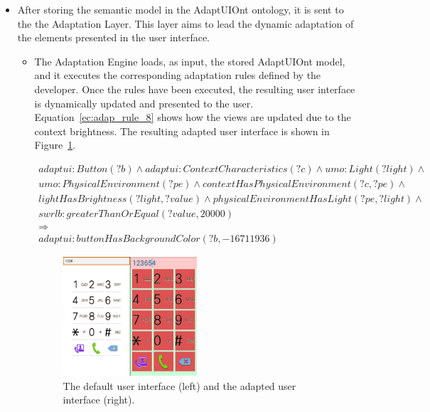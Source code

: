 \begin{itemize}
  \item After storing the semantic model in the AdaptUIOnt ontology, it is sent
  to the the Adaptation Layer. This layer aims to lead the dynamic adaptation of
  the elements presented in the user interface.
  
  \begin{itemize}
    \item The Adaptation Engine loads, as input, the stored AdaptUIOnt model, 
    and it executes the corresponding adaptation rules defined by the developer. 
    Once the rules have been executed, the resulting user interface is dynamically 
    updated and presented to the user. Equation~\ref{ec:adap_rule_8} shows how
    the views are updated due to the context brightness. The resulting adapted
    user interface is shown in Figure~\ref{fig:example_scenario_default_vs_adapted}.

    \footnotesize
    \begin{equation} \label{ec:adap_rule_8} 
    \begin{align*} 
    adaptui:Button (?b) ∧ adaptui:ContextCharacteristics(?c) ∧ umo:Light (?light) ∧ \\  
    umo:PhysicalEnvironment (?pe) ∧ contextHasPhysicalEnvironment (?c, ?pe) ∧ \\ 
    lightHasBrightness (?light, ?value) ∧ physicalEnvironmentHasLight (?pe, ?light) ∧ \\
    swrlb:greaterThanOrEqual (?value, 20000) \\
    \Rightarrow \\
    adaptui:buttonHasBackgroundColor (?b, -16711936)
    \end{align*}
    \end{equation}
    \normalsize
    
    \begin{figure}
    \centering
    \includegraphics[width=0.50\textwidth]{example_scenario_default_vs_adapted.png}
    \caption{The default user interface (left) and the adapted user interface (right).}
    \label{fig:example_scenario_default_vs_adapted}
    \end{figure}
    

\end{itemize}
\end{itemize}
